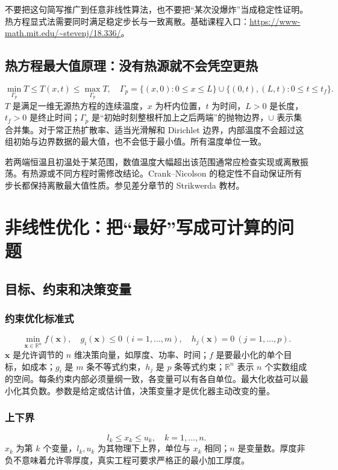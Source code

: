\documentclass[UTF8,zihao=-4,openany,oneside,fontset=windows]{ctexbook}
\begin{document}
不要把这句简写推广到任意非线性算法，也不要把“某次没爆炸”当成稳定性证明。热方程显式法需要同时满足稳定步长与一致离散。基础课程入口：\url{https://www-math.mit.edu/~stevenj/18.336/}。

\section{热方程最大值原理：没有热源就不会凭空更热}
\begin{equation}\min_{\Gamma_p}T\le T(x,t)\le\max_{\Gamma_p}T,\quad \Gamma_p=\{(x,0):0\le x\le L\}\cup\{(0,t),(L,t):0\le t\le t_f\}.\end{equation}
$T$ 是满足一维无源热方程的连续温度，$x$ 为杆内位置，$t$ 为时间，$L>0$ 是长度，$t_f>0$ 是终止时间；$\Gamma_p$ 是“初始时刻整根杆加上之后两端”的抛物边界，$\cup$ 表示集合并集。对于常正热扩散率、适当光滑解和 Dirichlet 边界，内部温度不会超过这组初始与边界数据的最大值，也不会低于最小值。所有温度单位一致。

若两端恒温且初温处于某范围，数值温度大幅超出该范围通常应检查实现或离散振荡。有热源或不同方程时需修改结论。Crank--Nicolson 的稳定性不自动保证所有步长都保持离散最大值性质。参见差分章节的 Strikwerda 教材。

\chapter{非线性优化：把“最好”写成可计算的问题}
\section{目标、约束和决策变量}
\subsection{约束优化标准式}
\begin{equation}\min_{\boldsymbol x\in\mathbb R^n}f(\boldsymbol x),\quad g_i(\boldsymbol x)\le0\ (i=1,\ldots,m),\quad h_j(\boldsymbol x)=0\ (j=1,\ldots,p).\end{equation}
$\boldsymbol x$ 是允许调节的 $n$ 维决策向量，如厚度、功率、时间；$f$ 是要最小化的单个目标，如成本；$g_i$ 是 $m$ 条不等式约束，$h_j$ 是 $p$ 条等式约束；$\mathbb R^n$ 表示 $n$ 个实数组成的空间。每条约束内部必须量纲一致，各变量可以有各自单位。最大化收益可以最小化其负数。参数是给定或估计值，决策变量才是优化器主动改变的量。
\subsection{上下界}
\begin{equation}l_k\le x_k\le u_k,\quad k=1,\ldots,n.\end{equation}
$x_k$ 为第 $k$ 个变量，$l_k,u_k$ 为其物理下上界，单位与 $x_k$ 相同；$n$ 是变量数。厚度非负不意味着允许零厚度，真实工程可要求严格正的最小加工厚度。
\end{document}

